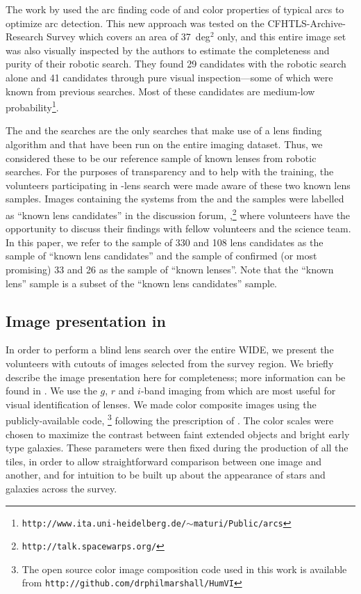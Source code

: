 \documentclass[useAMS,usenatbib,a4paper]{mn2e}
\begin{document}
The work by \citet{Maturi2014} used the arc finding code of
\citet{Seidel2007} and color properties of typical arcs to optimize arc
detection. This new approach was tested on the CFHTLS-Archive-Research
Survey \citep[CARS,][]{Erben2009} which covers an area of 37~deg$^2$
only, and this entire image set was also visually inspected by the authors to
estimate the completeness and purity of their robotic search. They found 29
candidates with the robotic search alone and 41 candidates through pure
visual inspection---some of which were known from previous searches. Most
of these candidates are medium-low
probability\footnote{\texttt{http://www.ita.uni-heidelberg.de/$\sim$maturi/Public/arcs}}.

The \rf and the \af searches are the only searches that make use of a
lens finding algorithm and that have been run on the entire \cfhtls
imaging dataset.  Thus, we considered these to be our reference sample of known
lenses from robotic searches. For the purposes of transparency and to
help with the training, the volunteers participating in \sw-\cfhtls lens
search were made aware of these two known lens samples. Images
containing the systems from the \rf and the \af samples were labelled as
``known lens candidates'' in the \sw discussion forum,
\Talk,\footnote{\texttt{http://talk.spacewarps.org/}} where volunteers have the
opportunity to discuss their findings with fellow volunteers and the
science team. In this paper, we refer to the sample of 330 \rf and 108
\af lens candidates as the sample of ``known lens candidates'' and the
sample of confirmed (or most promising) 33 \rf and 26 \af as the sample
of ``known lenses''. Note that the ``known lens'' sample is a subset of
the ``known lens candidates'' sample.


\subsection{Image presentation in \sw}
\label{sec:data:impres}

In order to perform a blind lens search over the entire \cfhtls
WIDE, we present the volunteers with cutouts of images selected
from the survey region. We briefly describe the image presentation here
for completeness; more information can be found in \PaperOne. We use
the $g$, $r$ and $i$-band imaging from \cfhtls which are most useful for
visual identification of lenses.  We made color composite images using
the publicly-available code, \humvi\footnote{The open source  color image
composition code used in this work is available from
\texttt{http://github.com/drphilmarshall/HumVI}} following the
prescription of \citet{Lupton2004}. The color scales were chosen to
maximize the contrast between faint extended objects and bright early type galaxies.
These parameters
were then fixed during the production of all the tiles, in order to allow
straightforward comparison between one image and another, and for
intuition to be built up about the appearance of stars and galaxies
across the survey.
\end{document}
